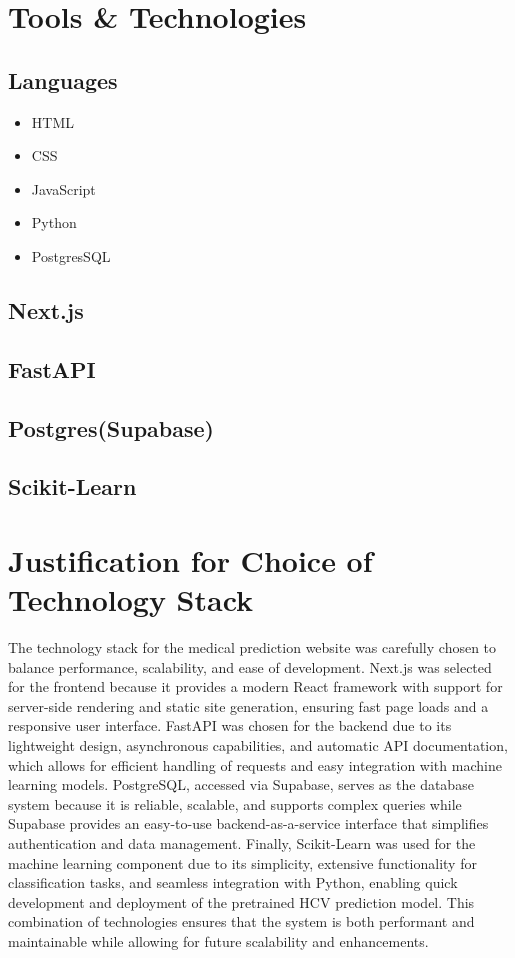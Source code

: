 \section{Tools \& Technologies}
\subsection{Languages}
\begin{itemize}
  \item HTML
  \item CSS 
  \item JavaScript 
  \item Python
  \item PostgresSQL

\end{itemize}
\subsection{Next.js}
\subsection{FastAPI}
\subsection{Postgres(Supabase)}
\subsection{Scikit-Learn}

\section*{Justification for Choice of Technology Stack}

The technology stack for the medical prediction website was carefully chosen to balance performance, scalability, and ease of development. Next.js was selected for the frontend because it provides a modern React framework with support for server-side rendering and static site generation, ensuring fast page loads and a responsive user interface. FastAPI was chosen for the backend due to its lightweight design, asynchronous capabilities, and automatic API documentation, which allows for efficient handling of requests and easy integration with machine learning models. PostgreSQL, accessed via Supabase, serves as the database system because it is reliable, scalable, and supports complex queries while Supabase provides an easy-to-use backend-as-a-service interface that simplifies authentication and data management. Finally, Scikit-Learn was used for the machine learning component due to its simplicity, extensive functionality for classification tasks, and seamless integration with Python, enabling quick development and deployment of the pretrained HCV prediction model. This combination of technologies ensures that the system is both performant and maintainable while allowing for future scalability and enhancements.
